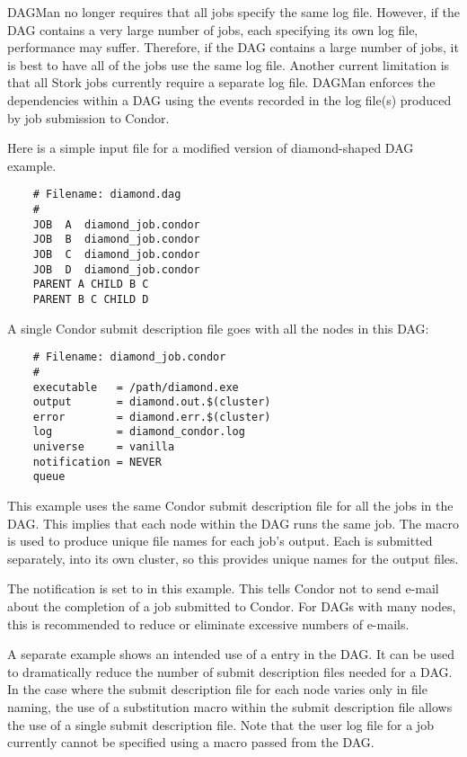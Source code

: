 DAGMan no longer requires that all jobs specify the same log file.
However, if the DAG contains a very large number of jobs, each
specifying its own log file, performance may suffer.  Therefore,
if the DAG contains a large number of jobs, it is best to have
all of the jobs use the same log file.
Another current limitation is that all
Stork jobs currently require a separate log file.
DAGMan enforces the dependencies within a DAG
using the events recorded in the
log file(s) produced by job submission to Condor.

Here is a simple input file for a 
modified version of diamond-shaped DAG example.

\begin{verbatim}
    # Filename: diamond.dag
    #
    JOB  A  diamond_job.condor 
    JOB  B  diamond_job.condor 
    JOB  C  diamond_job.condor	
    JOB  D  diamond_job.condor
    PARENT A CHILD B C
    PARENT B C CHILD D
\end{verbatim}

A single Condor submit description file goes with all the nodes
in this DAG:

\begin{verbatim}
    # Filename: diamond_job.condor
    #
    executable   = /path/diamond.exe
    output       = diamond.out.$(cluster)
    error        = diamond.err.$(cluster)
    log          = diamond_condor.log
    universe     = vanilla
    notification = NEVER
    queue
\end{verbatim}

This example uses the same Condor submit description file
for all the jobs in the DAG.
This implies that each node within the DAG runs the
same job.
The  macro
is used to produce unique file names for each job's output.
Each  is submitted separately, into its own cluster,
so this provides unique names for the output files.

The notification is set to \verb@NEVER@ in this example.
This tells Condor not to send e-mail about the completion of a job
submitted to Condor.
For DAGs with many nodes, this is recommended
to reduce or eliminate excessive numbers of e-mails.

A separate example shows an intended use of a  entry
in the DAG.
It can be used to dramatically reduce the number of submit description
files needed for a DAG.
In the case where the submit description file for each node
varies only in file naming, the use of a substitution macro
within the submit description file allows the use of 
a single submit description file.
Note that the user log file for a job currently cannot be specified
using a macro passed from the DAG.

